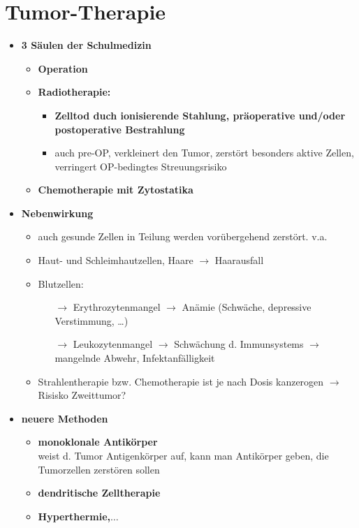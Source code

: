  \section*{Tumor-Therapie}
	\begin{itemize}
		\item \textbf{3 Säulen der Schulmedizin}
			\begin{itemize}
				\item \textbf{Operation}
				\item \textbf{Radiotherapie:}
					\begin{itemize}
						\item \textbf{Zelltod duch ionisierende Stahlung, präoperative und/oder postoperative Bestrahlung}
						\item auch pre-OP, verkleinert den Tumor, zerstört besonders aktive Zellen, verringert OP-bedingtes Streuungsrisiko
					\end{itemize}					
				\item \textbf{Chemotherapie mit Zytostatika}
			\end{itemize}
		\item \textbf{Nebenwirkung}
			\begin{itemize}
				\item auch gesunde Zellen in Teilung werden vorübergehend zerstört. v.a. 
				\item Haut- und Schleimhautzellen, Haare $\rightarrow$ Haarausfall
				\item Blutzellen:
					\begin{itemize}
						\item[$\rightarrow$] Erythrozytenmangel $\rightarrow$ Anämie (Schwäche, depressive Verstimmung, …)
						\item[$\rightarrow$] Leukozytenmangel $\rightarrow$ Schwächung d. Immunsystems $\rightarrow$ mangelnde Abwehr, Infektanfälligkeit
					\end{itemize}
				\item Strahlentherapie bzw. Chemotherapie ist je nach Dosis kanzerogen $\rightarrow$ Risisko Zweittumor?
			\end{itemize}
		\item \textbf{neuere Methoden}
			\begin{itemize}
				\item \textbf{monoklonale Antikörper}\\
					weist d. Tumor Antigenkörper auf, kann man Antikörper geben, die Tumorzellen zerstören sollen
				\item \textbf{dendritische Zelltherapie}
				\item \textbf{Hyperthermie,$\dots$}
			\end{itemize}
	\end{itemize}
\pagebreak
